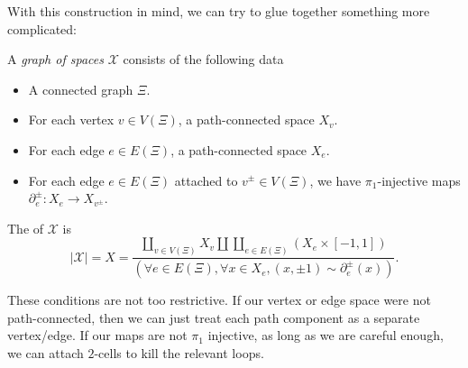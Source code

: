 \documentclass[a4paper]{article}
\begin{document}
With this construction in mind, we can try to glue together something more complicated:
\begin{defi}
  A \emph{graph of spaces} $\mathcal{X}$ consists of the following data
  \begin{itemize}
    \item A connected graph $\Xi$.
    \item For each vertex $v \in V(\Xi)$, a path-connected space $X_v$.
    \item For each edge $e \in E(\Xi)$, a path-connected space $X_e$.
    \item For each edge $e \in E(\Xi)$ attached to $v^{\pm} \in V(\Xi)$, we have $\pi_1$-injective maps $\partial^{\pm}_e : X_e \to X_{v^{\pm}}$.
  \end{itemize}
  The  of $\mathcal{X}$ is
  \[
    |\mathcal{X}| = X = \frac{\coprod_{v \in V(\Xi)} X_v \amalg \coprod_{e \in E(\Xi)} (X_e \times [-1, 1])}{(\forall e \in E(\Xi), \forall x \in X_e, (x, \pm 1) \sim \partial_e^{\pm}(x))}.
  \]
\end{defi}
These conditions are not too restrictive. If our vertex or edge space were not path-connected, then we can just treat each path component as a separate vertex/edge. If our maps are not $\pi_1$ injective, as long as we are careful enough, we can attach $2$-cells to kill the relevant loops.

%
%
\end{document}
